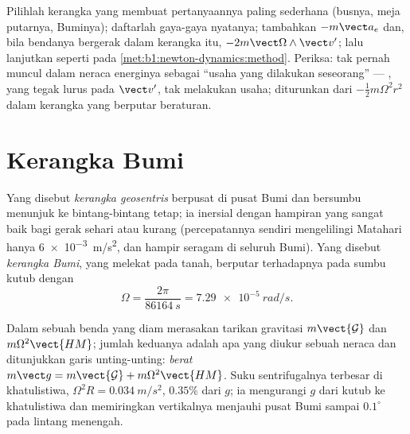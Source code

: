 \begin{method}\label{met:b1:non-inertial-frames:method}
Pilihlah kerangka yang membuat pertanyaannya paling sederhana (busnya, meja
putarnya, Buminya); daftarlah gaya-gaya nyatanya; tambahkan $-m\vect a_e$ dan, bila
bendanya bergerak dalam kerangka itu, $-2m\vect\Omega\wedge\vect v'$; lalu lanjutkan seperti pada
\cref{met:b1:newton-dynamics:method}. Periksa:  tak pernah
muncul dalam neraca energinya sebagai ``usaha yang dilakukan seseorang'' --- , yang tegak lurus pada $\vect v'$, tak melakukan usaha; 
diturunkan dari  $-\tfrac12 m\Omega^2r^2$ dalam kerangka yang
berputar beraturan.
\end{method}

\section{Kerangka Bumi}

\begin{definition}\label{def:b1:non-inertial-frames:earth}
Yang disebut \emph{kerangka geosentris} berpusat di pusat Bumi dan
bersumbu menunjuk ke bintang-bintang tetap; ia inersial dengan hampiran
yang sangat baik bagi gerak sehari atau kurang (percepatannya sendiri
mengelilingi Matahari hanya \qty{6e-3}{m/s^2}, dan hampir seragam di seluruh Bumi).
Yang disebut \emph{kerangka Bumi}, yang melekat pada tanah, berputar
terhadapnya pada sumbu kutub dengan
\[
\Omega = \frac{2\pi}{\qty{86164}{s}} = \qty{7.29e-5}{rad/s} .
\]
\end{definition}

\begin{proposition}\label{prop:b1:non-inertial-frames:weight}
Dalam  sebuah benda yang diam merasakan tarikan
gravitasi $m\vect{\mathcal G}$ dan  $m\Omega^2\vect{HM}$; jumlah keduanya
adalah apa yang diukur sebuah neraca dan ditunjukkan garis unting-unting: \emph{berat}
$m\vect g = m\vect{\mathcal G} + m\Omega^2\vect{HM}$. Suku sentrifugalnya terbesar
di khatulistiwa, $\Omega^2R = \qty{0.034}{m/s^2}$, $0.35\%$ dari $g$; ia
mengurangi $g$ dari kutub ke khatulistiwa dan memiringkan vertikalnya menjauhi
pusat Bumi sampai $0.1^\circ$ pada lintang menengah.
\end{proposition}

